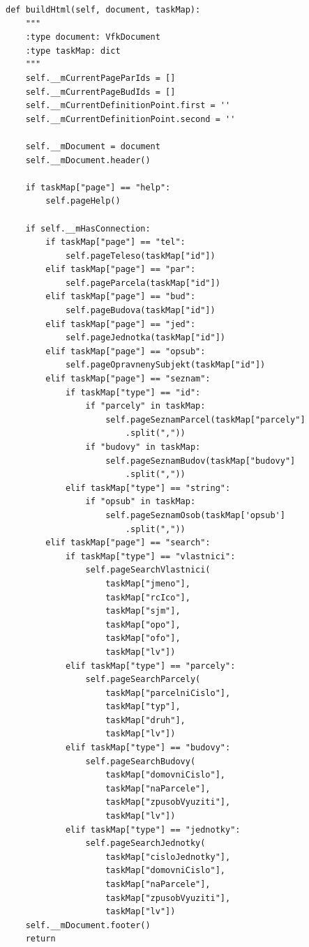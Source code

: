 \documentclass[a4paper,12pt,oneside]{book}
\begin{document}
{\scriptsize
\begin{lstlisting}[style=python, label=l_buildHtml]
def buildHtml(self, document, taskMap):
    """
    :type document: VfkDocument
    :type taskMap: dict
    """
    self.__mCurrentPageParIds = []
    self.__mCurrentPageBudIds = []
    self.__mCurrentDefinitionPoint.first = ''
    self.__mCurrentDefinitionPoint.second = ''

    self.__mDocument = document
    self.__mDocument.header()

    if taskMap["page"] == "help":
        self.pageHelp()

    if self.__mHasConnection:
        if taskMap["page"] == "tel":
            self.pageTeleso(taskMap["id"])
        elif taskMap["page"] == "par":
            self.pageParcela(taskMap["id"])
        elif taskMap["page"] == "bud":
            self.pageBudova(taskMap["id"])
        elif taskMap["page"] == "jed":
            self.pageJednotka(taskMap["id"])
        elif taskMap["page"] == "opsub":
            self.pageOpravnenySubjekt(taskMap["id"])
        elif taskMap["page"] == "seznam":
            if taskMap["type"] == "id":
                if "parcely" in taskMap:
                    self.pageSeznamParcel(taskMap["parcely"]
                    	.split(","))
                if "budovy" in taskMap:
                    self.pageSeznamBudov(taskMap["budovy"]
                    	.split(","))
            elif taskMap["type"] == "string":
                if "opsub" in taskMap:
                    self.pageSeznamOsob(taskMap['opsub']
                    	.split(","))
        elif taskMap["page"] == "search":
            if taskMap["type"] == "vlastnici":
                self.pageSearchVlastnici(
                    taskMap["jmeno"], 
                    taskMap["rcIco"],
                    taskMap["sjm"], 
                    taskMap["opo"],
                    taskMap["ofo"], 
                    taskMap["lv"])
            elif taskMap["type"] == "parcely":
                self.pageSearchParcely(
                    taskMap["parcelniCislo"], 
                    taskMap["typ"], 
                    taskMap["druh"], 
                    taskMap["lv"])
            elif taskMap["type"] == "budovy":
                self.pageSearchBudovy(
                    taskMap["domovniCislo"], 
                    taskMap["naParcele"], 
                    taskMap["zpusobVyuziti"],
                    taskMap["lv"])
            elif taskMap["type"] == "jednotky":
                self.pageSearchJednotky(
                    taskMap["cisloJednotky"], 
                    taskMap["domovniCislo"], 
                    taskMap["naParcele"],
                    taskMap["zpusobVyuziti"], 
                    taskMap["lv"])
    self.__mDocument.footer()
    return
\end{lstlisting}
}
\end{document}
